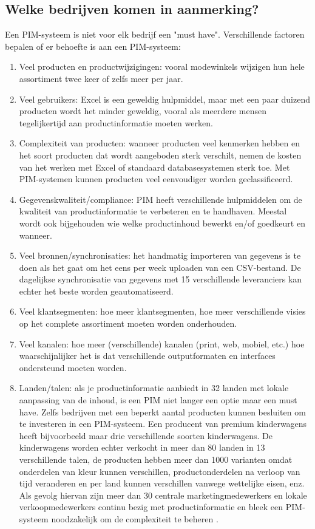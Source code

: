 \subsection{Welke bedrijven komen in aanmerking?}
\label{Welke bedrijven komen in aanmerking?}
Een PIM-systeem is niet voor elk bedrijf een "must have". Verschillende factoren bepalen of er behoefte is aan een PIM-systeem:
\begin{enumerate}
    \item Veel producten en productwijzigingen: vooral modewinkels wijzigen hun hele assortiment twee keer of zelfs meer per jaar.
    \item Veel gebruikers: Excel is een geweldig hulpmiddel, maar met een paar duizend producten wordt het minder geweldig, vooral als meerdere mensen tegelijkertijd aan productinformatie moeten werken.
    \item Complexiteit van producten: wanneer producten veel kenmerken hebben en het soort producten dat wordt aangeboden sterk verschilt, nemen de kosten van het werken met Excel of standaard databasesystemen sterk toe. Met PIM-systemen kunnen producten veel eenvoudiger worden geclassificeerd.
    \item Gegevenskwaliteit/compliance: PIM heeft verschillende hulpmiddelen om de kwaliteit van productinformatie te verbeteren en te handhaven. Meestal wordt ook bijgehouden wie welke productinhoud bewerkt en/of goedkeurt en wanneer.
    \item Veel bronnen/synchronisaties: het handmatig importeren van gegevens is te doen als het gaat om het eens per week uploaden van een CSV-bestand. De dagelijkse synchronisatie van gegevens met 15 verschillende leveranciers kan echter het beste worden geautomatiseerd.
    \item Veel klantsegmenten: hoe meer klantsegmenten, hoe meer verschillende visies op het complete assortiment moeten worden onderhouden.
    \item Veel kanalen: hoe meer (verschillende) kanalen (print, web, mobiel, etc.) hoe waarschijnlijker het is dat verschillende outputformaten en interfaces ondersteund moeten worden.
    \item Landen/talen: als je productinformatie aanbiedt in 32 landen met lokale aanpassing van de inhoud, is een PIM niet langer een optie maar een must have. Zelfs bedrijven met een beperkt aantal producten kunnen besluiten om te investeren in een PIM-systeem. Een producent van premium kinderwagens heeft bijvoorbeeld maar drie verschillende soorten kinderwagens. De kinderwagens worden echter verkocht in meer dan 80 landen in 13 verschillende talen, de producten hebben meer dan 1000 varianten omdat onderdelen van kleur kunnen verschillen, productonderdelen na verloop van tijd veranderen en per land kunnen verschillen vanwege wettelijke eisen, enz. Als gevolg hiervan zijn meer dan 30 centrale marketingmedewerkers en lokale verkoopmedewerkers continu bezig met productinformatie en bleek een PIM-systeem noodzakelijk om de complexiteit te beheren \autocite{Abraham2014}.
\end{enumerate}


